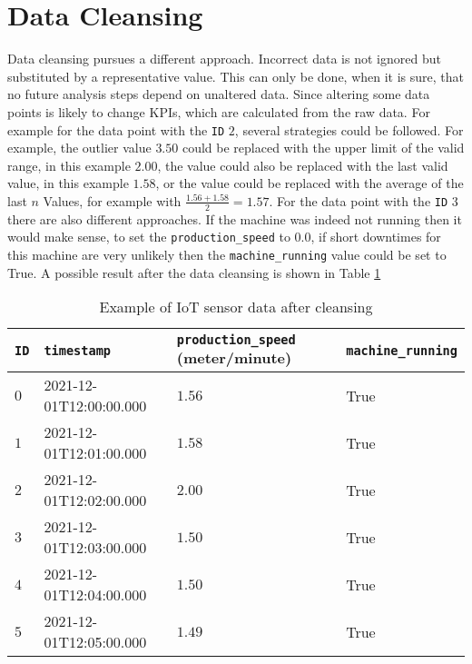 \section{Data Cleansing}
Data cleansing pursues a different approach. Incorrect data is not ignored but substituted by a representative value. This can only be done, when it is sure, that no future analysis steps depend on unaltered data. Since altering some data points is likely to change \acp{KPI}, which are calculated from the raw data.
For example for the data point with the \verb|ID| $2$, several strategies could be followed. For example, the outlier value $3.50$ could be replaced with the upper limit of the valid range, in this example $2.00$, the value could also be replaced with the last valid value, in this example $1.58$, or the value could be replaced with the average of the last $n$ Values, for example with $\frac{1.56+1.58}{2} = 1.57$. For the data point with the \verb|ID| $3$ there are also different approaches. If the machine was indeed not running then it would make sense, to set the \verb|production_speed| to $0.0$, if short downtimes for this machine are very unlikely then the \verb|machine_running| value could be set to True. A possible result after the data cleansing is shown in Table \ref{table:example-iot-data-after-cleansing} \cite{maleticDataCleansingIntegrity2000}
\begin{table}[ht]
\begin{tabular}{|l|l|l|l|}
\hline
\verb|ID| & \verb|timestamp|        & \verb|production_speed| (meter/minute) & \verb|machine_running| \\ \hline
$0$       & 2021-12-01T12:00:00.000 & $1.56$                                 & True                   \\ \hline
$1$       & 2021-12-01T12:01:00.000 & $1.58$                                 & True                   \\ \hline
$2$       & 2021-12-01T12:02:00.000 & $2.00$                                 & True                   \\ \hline
$3$       & 2021-12-01T12:03:00.000 & $1.50$                                 & True                   \\ \hline
$4$       & 2021-12-01T12:04:00.000 & $1.50$                                 & True                   \\ \hline
$5$       & 2021-12-01T12:05:00.000 & $1.49$                                 & True                   \\ \hline
\end{tabular}
\caption{Example of IoT sensor data after cleansing}
\label{table:example-iot-data-after-cleansing}
\end{table}